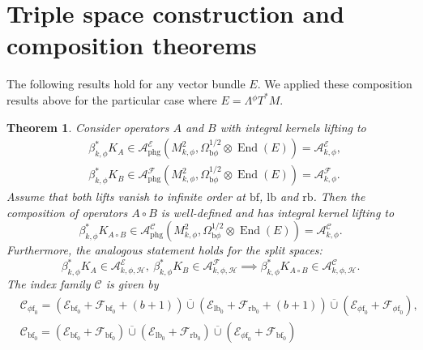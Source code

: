 \documentclass[11pt]{article}
\numberwithin{equation}{section}
\newcommand{\bphi}{{\bb\phi}}
\theoremstyle{plain}
\newtheorem{Th}{Theorem}[section]
\theoremstyle{definition}
\newcommand{\Hmath}{{\mathscr{H}}}
\newcommand\calA{{\mathcal A}}
\newcommand\calE{{\mathcal E}}
\newcommand\calF{{\mathcal F}}
\newcommand {\phg}{{\mathrm{phg}}}
\newcommand{\phif}{{\phi\mathrm{f}}}
\newcommand{\lf}{{\mathrm{lb}}}
\newcommand{\rf}{{\mathrm{rb}}}
\newcommand{\bb}{{\mathrm{b}}}
\newcommand{\rfz}{{\mathrm{rb}_0}}
\newcommand{\bbf}{{\mathrm{bf}}}
\newcommand{\bfz}{{\bbf_0}}
\DeclareMathOperator{\End}{End}
\begin{document}
\section{Triple space construction and composition theorems} \label{section 6}
The following results hold for any vector bundle $E$.
We applied these composition results above for the particular case
where $E= \Lambda {}^\phi T^*M$.

\begin{Th} \label{compositionth-smooth}
Consider operators $A$ and $B$ with integral kernels lifting to
\begin{equation}
\begin{split}
&\beta_{k,\phi}^*K_{A} \in \mathcal{A}_{\phg}^{\mathcal{E}}(M^2_{k,\phi}, \Omega_{\bphi}^{1/2}
\otimes \End(E)) = \mathcal{A}^{\mathcal{E}}_{k,\phi}, \\
&\beta_{k,\phi}^*K_{B} \in \mathcal{A}_{\phg}^{\mathcal{F}}(M^2_{k,\phi}, \Omega_{\bphi}^{1/2}
\otimes \End(E)) = \mathcal{A}^{\mathcal{F}}_{k,\phi}.
\end{split}
\end{equation}
Assume that both lifts vanish to infinite order at $\bbf$, $\lf$ and $\rf$. Then the composition of operators $A \circ B$
is well-defined and has integral kernel lifting to
\begin{equation}
\label{eqn:AB}
\beta_{k,\phi}^*K_{A \circ B} \in \mathcal{A}_{\phg}^{\mathscr{C}}(M^2_{k,\phi}, \Omega_{\bphi}^{1/2}
\otimes \End(E)) = \mathcal{A}^{\mathscr{C}}_{k,\phi}.
\end{equation}
Furthermore, the analogous statement holds for the split spaces:
\begin{equation}
\label{eqn:AB split}
\beta_{k,\phi}^*K_{A}\in \calA^\calE_{k,\phi,\Hmath},\ \beta_{k,\phi}^* K_{B} \in\calA^\calF_{k,\phi,\Hmath}\implies
\beta_{k,\phi}^*K_{A\circ B} \in \calA^{\mathscr{C}}_{k,\phi,\Hmath}.
\end{equation}
The index family $\mathscr{C}$ is given by
\begin{equation}\label{composition-index-family}
\begin{split}
&\mathscr{C}_{\phif_0} = \left(\mathcal{E}_{\bbf_0} + \mathcal{F}_{\bbf_0} + (b+1)\right)
\overline{\cup} \left(\mathcal{E}_{\lf_0} + \mathcal{F}_{\rf_0} + (b+1)\right)
\overline{\cup} \left(\mathcal{E}_{\phif_0} + \mathcal{F}_{\phif_0} \right), \\
&\mathscr{C}_{\bfz} = (\mathcal{E}_{\bfz} + \mathcal{F}_{\bfz})
\overline{\cup} (\mathcal{E}_{\lf_{0}} + \mathcal{F}_{\rfz}) \overline{\cup} (\mathcal{E}_{\phif_0} + \mathcal{F}_{\bbf_0})

\end{split}
\end{equation}
\end{Th}
\end{document}
